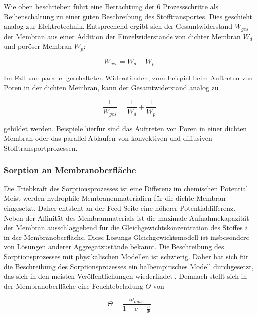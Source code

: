 \begin{normalsize}
\begin{LARGE}
Wie oben beschrieben führt eine Betrachtung der 6 Prozessschritte als Reihenschaltung zu einer guten Beschreibung des Stofftransportes. Dies geschieht analog zur Elektrotechnik. Entsprechend ergibt sich der Gesamtwiderstand $W_{ges}$ der Membran aus einer Addition der Einzelwiderstände von dichter Membran $W_{d}$ und poröser Membran $W_{p}$:

 \begin{equation}
 W_{ges} = W_{d} + W_{p}
\end{equation} 
 
Im Fall von parallel geschalteten Widerständen, zum Beispiel beim Auftreten von Poren in der dichten Membran, kann der Gesamtwiderstand analog zu 

\begin{equation}
\frac{1}{W_{ges}} = \frac{1}{W_{d}} + \frac{1}{W_{p}}
\end{equation}

gebildet werden. Beispiele hierfür sind das Auftreten von Poren in einer dichten Membran oder das parallel Ablaufen von konvektiven und diffusiven Stofftransportprozessen.


\subsubsection{Sorption an Membranoberfläche}
Die Triebkraft des Sorptionsprozesses ist eine Differenz im chemischen Potential.  Meist werden hydrophile Membranenmaterialien für die dichte Membran eingesetzt. Daher entsteht an der Feed-Seite eine höherer Potentialdifferenz. Neben der Affinität des Membranmaterials ist die maximale Aufnahmekapazität der Membran ausschlaggebend für die Gleichgewichtskonzentration des Stoffes $i$ in der Membranoberfläche. Diese Lösungs-Gleichgewichtsmodell ist insbesondere von Lösungen anderer Aggregatzustände bekannt. Die Beschreibung des Sorptionsprozesses mit physikalischen Modellen ist schwierig. Daher hat sich für die Beschreibung des Sorptionsprozesses ein halbempirisches Modell durchgesetzt, das sich in den meisten Veröffentlichungen wiederfindet
. Demnach stellt sich in der Membranoberfläche eine Feuchtebeladung $\Theta$ von 

\begin{equation}
\Theta = \dfrac{\omega_{max}}{1-c+\frac{c}{\Phi}}
\end{equation}


\end{LARGE}
\end{normalsize}
